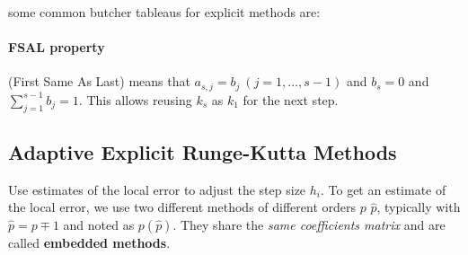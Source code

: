 some common butcher tableaus for explicit methods are:


\paragraph{FSAL property} (First Same As Last) means that $a_{s,j}=b_j\ (j=1,\ldots,s-1)$
and $b_s = 0$ and $\sum_{j=1}^{s-1}b_j = 1$.
This allows reusing $k_s$ as $k_1$ for the next step.

\subsection{Adaptive Explicit Runge-Kutta Methods}

Use estimates of the local error to adjust the step size $h_i$.
To get an estimate of the local error, we use two different methods of different
\colorbox{shadecolor}{orders $p$ $\hat{p}$},
typically with $\hat{p}=p\mp1$ and noted as $p(\hat{p})$.
They share the \emph{same coefficients matrix} and are called \textbf{embedded methods}.

